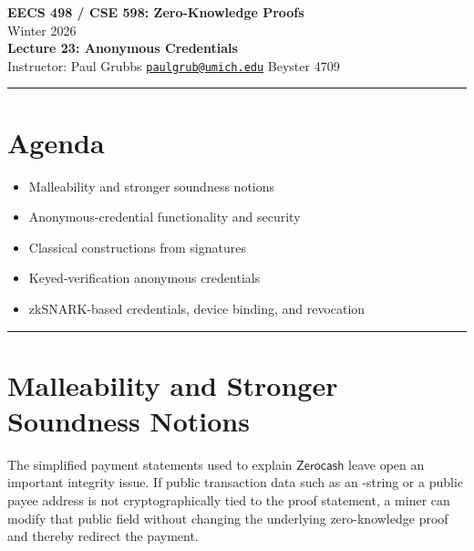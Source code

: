 \documentclass[11pt]{article}
\newcommand{\Zerocash}{\ensuremath{\mathsf{Zerocash}}}
\begin{document}
\begin{center}
  {\LARGE \textbf{EECS 498 / CSE 598: Zero-Knowledge Proofs}}\\[6pt]
  {\large Winter 2026}\\[4pt]
  {\large \textbf{Lecture 23: Anonymous Credentials}}\\[4pt]
  {\large Instructor: Paul Grubbs \quad
    \href{mailto:paulgrub@umich.edu}{\texttt{paulgrub@umich.edu}} \quad
    Beyster 4709}
\end{center}

\vspace{0.5em}
\hrule
\vspace{1em}

\section*{Agenda}
\begin{itemize}
  \item Malleability and stronger soundness notions
  \item Anonymous-credential functionality and security
  \item Classical constructions from signatures
  \item Keyed-verification anonymous credentials
  \item zkSNARK-based credentials, device binding, and revocation
\end{itemize}

\hrule
\vspace{1em}

\section{Malleability and Stronger Soundness Notions}

The simplified payment statements used to explain \Zerocash{} leave open an
important integrity issue.  If public transaction data such as an
-string or a public payee address is not cryptographically tied to
the proof statement, a miner can modify that public field without changing the
underlying zero-knowledge proof and thereby redirect the payment.
\end{document}
